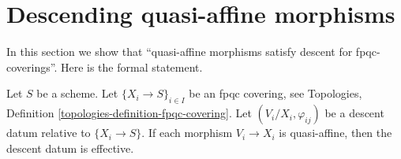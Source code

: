 \section{Descending quasi-affine morphisms}
\label{section-quasi-affine}

\noindent
In this section we show that
``quasi-affine morphisms satisfy descent for fpqc-coverings''.
Here is the formal statement.

\begin{lemma}
\label{lemma-quasi-affine}
Let $S$ be a scheme.
Let $\{X_i \to S\}_{i\in I}$ be an fpqc covering, see
Topologies, Definition \ref{topologies-definition-fpqc-covering}.
Let $(V_i/X_i, \varphi_{ij})$ be a descent datum
relative to $\{X_i \to S\}$. If each morphism
$V_i \to X_i$ is quasi-affine, then the descent datum is
effective.
\end{lemma}

